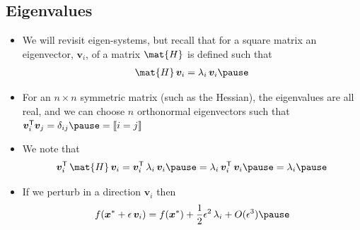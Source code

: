 \begin{slide}
\section[-2]{Eigenvalues}

\begin{PauseHighLight}
  \begin{itemize}\squeeze
  \item We will revisit eigen-systems, but recall that for a square
    matrix an eigenvector, $\bm{v}_i$, of a matrix $\mat{H}$
    is defined such that
    \begin{align*}
      \mat{H} \, \bm{v}_i = \lambda_i \, \bm{v}_i\pause
    \end{align*}
  \item For an $n\times n$ symmetric matrix (such as the Hessian),
    the eigenvalues are all real, and we can choose $n$ orthonormal
    eigenvectors such that $\bm{v}_i^\tr\bm{v}_j = \delta_{ij}\pause = \pred{i=j}$\pauseb
  \item We note that
    \begin{align*}
       \bm{v}_i^\tr\, \mat{H} \, \bm{v}_i = 
      \bm{v}_i^\tr\,\lambda_i \, \bm{v}_i \pause = \lambda_i \,
      \bm{v}_i^\tr\,\bm{v}_i\pause = \lambda_i\pause
    \end{align*}
  \item If we perturb in a direction $\bm{v}_i$ then
    \begin{align*}
      f(\bm{x}^* + \epsilon\, \bm{v}_i) =  f(\bm{x}^*) + \frac{1}{2}
      \epsilon^2\, \lambda_i + O(\epsilon^3)\pause
    \end{align*}
  \end{itemize}
\end{PauseHighLight}

\end{slide}


